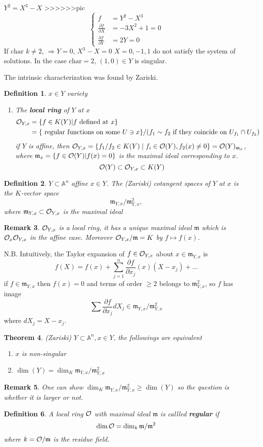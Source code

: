 \documentclass[11pt]{article}
\newtheorem{thm}{Theorem}[section]
\newtheorem{dfn}[thm]{Definition}
\newtheorem{rmk}[thm]{Remark}
\newcommand{\affn}{\mathbb A}
\newcommand{\scm}{{\mathfrak m}}
\newcommand{\calo}{{\cal O}}
\newcommand{\pd}{\partial}
\newcommand{\Lrta}{\Longrightarrow}
\begin{document}
$Y^2=X^3-X$
>>>>>>pic
$$
\left\{ \begin{aligned}
f&=Y^2-X^3\\
\frac{\pd f}{\pd X}&=-3X^2+1=0\\
\frac{\pd f}{\pd Y}&=2Y=0
\end{aligned}\right.
$$
If $\text{char }k\neq 2$, $\Lrta Y=0$, $X^3-X=0$ $X=0,-1,1$ do not satisfy the system of solutions. In the case $\text{char}=2$, $(1,0)\in Y$ is singular.


The intrinsic characterization was found by Zariski. 
\begin{dfn}
$x\in Y$ variety
\begin{enumerate}[label=(\arabic*)]
\item The \textbf{local ring} of $Y$ at $x$
$$
\begin{aligned}
\calo_{Y,x}&=\{f\in K(Y)|f\text{ defined  at } x\}\\
&=\{\text{ regular functions on some } U\ni x\}/(f_1\sim f_2\text{ if they coincide on } U_{f_1}\cap U_{f_2})
\end{aligned}
$$
if $Y$ is affine, then $\calo_{Y,x}=\{f_1/f_2\in K(Y) \mid f_i\in\calo(Y),f_2(x)\neq 0\}=\calo(Y)_{\scm_x}$, where $\scm_x=\{f\in\calo(Y)|f(x)=0\}$ is the maximal ideal corresponding to $x$.
$$
\calo(Y)\subset\calo_{Y,x}\subset K(Y)
$$
\end{enumerate}
\end{dfn}
\begin{dfn}
$Y\subset \affn^n$ affine $x\in Y$. The (Zariski) cotangent spaces of $Y$ at $x$ is the $K$-vector space
$$
\scm_{Y,x}/\scm_{Y,x}^2,
$$
where $\scm_{Y,x}\subset \calo_{Y,x}$ is the maximal ideal 
\end{dfn}
\begin{rmk}
$\calo_{Y,x}$ is a local ring, it has a unique maximal ideal $\scm$ which is $\calo_x\calo_{Y,x}$ in the affine case. Moreover $\calo_{Y,x}/\scm=K$ by $f\mapsto f(x)$.
\end{rmk}

N.B. Intuitively,  the Taylor expansion of $f\in \calo_{Y,x}$ about $x\in\scm_{Y,x}$ is
$$
f(X)=f(x)+\sum^n_{j=1}\frac{\pd f}{\pd x_j}(x)(X-x_j)+\dots
$$
if $f\in\scm_{Y,x}$ then $f(x)=0$ and terms of order $\geq 2$ belongs to $\scm_{Y,x}^2$, so $f$ has image
$$
\sum \frac{\pd f}{\pd x_j}dX_j\in \scm_{Y,x}/\scm_{Y,x}^2
$$
where $dX_j=X-x_j$.

\begin{thm}
(Zariski) $Y\subset \affn^n,x\in Y$, the followings are equivalent
\begin{enumerate}[label=(\arabic*)]
\item $x$ is non-singular
\item $\dim (Y)=\dim_K \scm_{Y,x}/\scm_{Y,x}^2$
\end{enumerate}
\end{thm}
\begin{rmk}
One can show $\dim_K\scm_{Y,x}/\scm_{Y,x}^2\geq \dim (Y)$ so the question is whether it is larger or not. 
\end{rmk}

\begin{dfn}
A local ring $\calo$ with maximal ideal $\scm$ is callled \textbf{regular} if 
$$
\dim \calo= \dim_k \scm/\scm^2
$$
where $k=\calo/\scm$ is the residue field.
\end{dfn}
\end{document}
